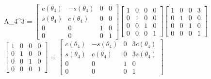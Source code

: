 \documentclass[12pt]{article}
\begin{document}
\begin{center}
    A_4^3 = $\left[\begin{matrix}c{\left(\theta_{4}\right)} & - s{\left(\theta_{4} \right)} & 0 & 0\\s{\left(\theta_{4} \right)} & c{\left(\theta_{4} \right)} & 0 & 0\\0 & 0 & 1 & 0\\0 & 0 & 0 & 1\end{matrix}\right]$$\left[\begin{matrix}1 & 0 & 0 & 0\\0 & 1 & 0 & 0\\0 & 0 & 1 & 0\\0 & 0 & 0 & 1\end{matrix}\right]$$\left[\begin{matrix}1 & 0 & 0 & 3\\0 & 1 & 0 & 0\\0 & 0 & 1 & 0\\0 & 0 & 0 & 1\end{matrix}\right]$$\left[\begin{matrix}1 & 0 & 0 & 0\\0 & 1 & 0 & 0\\0 & 0 & 1 & 0\\0 & 0 & 0 & 1\end{matrix}\right]$\newline
    = $\left[\begin{matrix}c{\left(\theta_{4} \right)} & - s{\left(\theta_{4} \right)} & 0 & 3 c{\left(\theta_{4} \right)}\\s{\left(\theta_{4} \right)} & c{\left(\theta_{4} \right)} & 0 & 3 s{\left(\theta_{4} \right)}\\0 & 0 & 1 & 0\\0 & 0 & 0 & 1\end{matrix}\right]$
\end{center}
\end{document}

